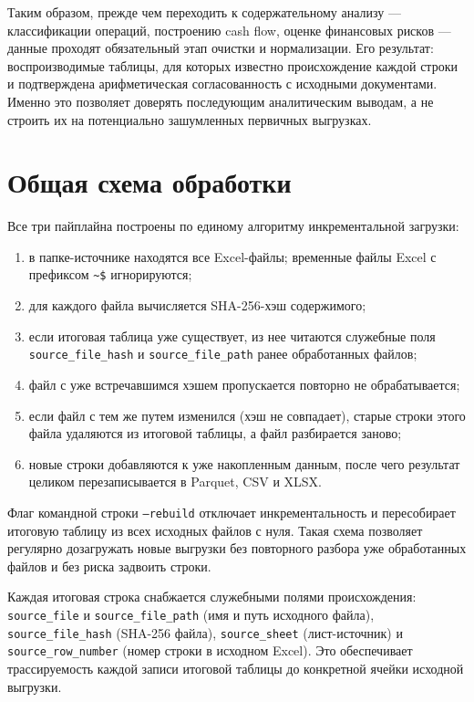 Таким образом, прежде чем переходить к содержательному анализу — классификации операций, построению cash flow, оценке финансовых рисков — данные проходят обязательный этап очистки и нормализации. Его результат: воспроизводимые таблицы, для которых известно происхождение каждой строки и подтверждена арифметическая согласованность с исходными документами. Именно это позволяет доверять последующим аналитическим выводам, а не строить их на потенциально зашумленных первичных выгрузках.

\section{Общая схема обработки}

Все три пайплайна построены по единому алгоритму инкрементальной загрузки:

\begin{enumerate}
  \item в папке-источнике находятся все Excel-файлы; временные файлы Excel с префиксом \texttt{\textasciitilde\$} игнорируются;
  \item для каждого файла вычисляется SHA-256-хэш содержимого;
  \item если итоговая таблица уже существует, из нее читаются служебные поля \texttt{source\_file\_hash} и \texttt{source\_file\_path} ранее обработанных файлов;
  \item файл с уже встречавшимся хэшем пропускается повторно не обрабатывается;
  \item если файл с тем же путем изменился (хэш не совпадает), старые строки этого файла удаляются из итоговой таблицы, а файл разбирается заново;
  \item новые строки добавляются к уже накопленным данным, после чего результат целиком перезаписывается в Parquet, CSV и XLSX.
\end{enumerate}

Флаг командной строки \texttt{--rebuild} отключает инкрементальность и пересобирает итоговую таблицу из всех исходных файлов с нуля. Такая схема позволяет регулярно дозагружать новые выгрузки без повторного разбора уже обработанных файлов и без риска задвоить строки.

Каждая итоговая строка снабжается служебными полями происхождения: \texttt{source\_file} и \texttt{source\_file\_path} (имя и путь исходного файла), \texttt{source\_file\_hash} (SHA-256 файла), \texttt{source\_sheet} (лист-источник) и \texttt{source\_row\_number} (номер строки в исходном Excel). Это обеспечивает трассируемость каждой записи итоговой таблицы до конкретной ячейки исходной выгрузки.

